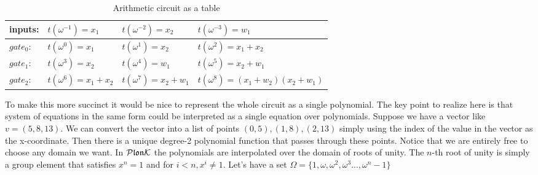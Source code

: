 \begin{table}[h]
    \centering
    \begin{tabular}{ l | l l l}
     inputs:   & $t(\omega^{-1})= x_1$ & $t(\omega^{-2})=x_2$ & $t(\omega^{-3})=w_1$ \\ 
     \hline
     $gate_0$: & $t(\omega^{0})=x_1$  & $t(\omega^{1})=x_2$  & $t(\omega^{2})=x_1 + x_2$ \\ 
     $gate_1$: & $t(\omega^{3})=x_2$  & $t(\omega^{4})=w_1$  & $t(\omega^{5})=x_2 + w_1$  \\ 
     $gate_2$: & $t(\omega^{6})=x_1 + x_2$ & $t(\omega^{7})=x_2 + w_1$  & $t(\omega^{8})=(x_1 + w_2)(x_2 + w_1)$ 
    \end{tabular}
    \caption{Arithmetic circuit as a table}
\end{table}





To make this more succinct it would be nice to represent the whole circuit as a single polynomial. The key point to realize here is that system of equations in the same form could be interpreted as a single equation over polynomials. Suppose we have a vector like $v=(5,8,13)$. We can convert the vector into a list of points $(0,5),(1,8),(2,13)$ simply using the index of the value in the vector as the x-coordinate. Then there is a unique degree-2 polynomial function that passes through these points. Notice that we are entirely free to choose any domain we want. In $\mathcal{P}\mathfrak{lon}\mathcal{K}$ the polynomials are interpolated over the domain of roots of unity. The $n$-th root of unity is simply a group element that satisfies $x^n = 1$ and for $i<n, x^i \neq 1$. Let's have a set $\Omega = \{1, \omega, \omega^2, \omega^3 ..., \omega^n-1\}$

